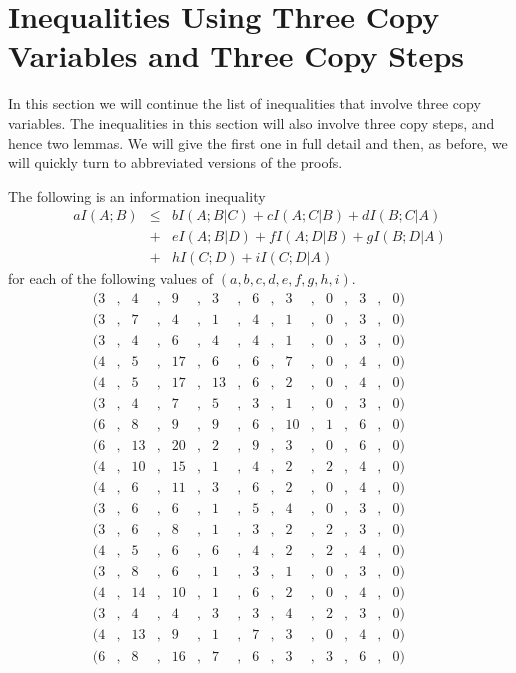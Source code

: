 \documentclass[10pt,journal]{IEEEtran}
\begin{document}

\section{Inequalities Using Three Copy Variables and Three Copy Steps}\label{ThreeCopiesB}

In this section we will continue the list of inequalities that involve three copy variables.
The inequalities in this section will also involve three copy steps, and hence two lemmas.
We will give the first one in full detail and then, as before, we will quickly turn to
abbreviated versions of the proofs.

\begin{theorem}
The following is an information inequality
\begin{eqnarray*}
aI(A;B) &\leq& bI(A;B|C) + cI(A;C|B) + dI(B;C|A) \\
      &+&  eI(A;B|D) + fI(A;D|B)+ gI(B;D|A)\\
      &+& hI(C;D) + iI(C;D|A)
\end{eqnarray*}
for each of the following values of $(a,b,c,d,e,f,g,h,i)$.
\begin{align}
&&(3&,&4&,&9&,&3&,&6&,&3&,&0&,&3&,&0)&&&& \label{ineq3.17}\\
&&(3&,&7&,&4&,&1&,&4&,&1&,&0&,&3&,&0)&&&& \label{ineq3.18}\\
&&(3&,&4&,&6&,&4&,&4&,&1&,&0&,&3&,&0)&&&& \label{ineq3.19}\\
&&(4&,&5&,&17&,&6&,&6&,&7&,&0&,&4&,&0)&&&& \label{ineq3.20}\\
&&(4&,&5&,&17&,&13&,&6&,&2&,&0&,&4&,&0)&&&& \label{ineq3.21}\\
&&(3&,&4&,&7&,&5&,&3&,&1&,&0&,&3&,&0)&&&& \label{ineq3.22}\\
&&(6&,&8&,&9&,&9&,&6&,&10&,&1&,&6&,&0)&&&& \label{ineq3.23}\\
&&(6&,&13&,&20&,&2&,&9&,&3&,&0&,&6&,&0)&&&& \label{ineq3.24}\\
&&(4&,&10&,&15&,&1&,&4&,&2&,&2&,&4&,&0)&&&& \label{ineq3.25}\\
&&(4&,&6&,&11&,&3&,&6&,&2&,&0&,&4&,&0)&&&& \label{ineq3.26}\\
&&(3&,&6&,&6&,&1&,&5&,&4&,&0&,&3&,&0)&&&& \label{ineq3.27}\\
&&(3&,&6&,&8&,&1&,&3&,&2&,&2&,&3&,&0)&&&& \label{ineq3.28}\\
&&(4&,&5&,&6&,&6&,&4&,&2&,&2&,&4&,&0)&&&& \label{ineq3.29}\\
&&(3&,&8&,&6&,&1&,&3&,&1&,&0&,&3&,&0)&&&& \label{ineq3.30}\\
&&(4&,&14&,&10&,&1&,&6&,&2&,&0&,&4&,&0)&&&& \label{ineq3.31}\\
&&(3&,&4&,&4&,&3&,&3&,&4&,&2&,&3&,&0)&&&& \label{ineq3.32}\\
&&(4&,&13&,&9&,&1&,&7&,&3&,&0&,&4&,&0)&&&& \label{ineq3.33}\\
&&(6&,&8&,&16&,&7&,&6&,&3&,&3&,&6&,&0)&&&& \label{ineq3.34}
\end{align}
\end{theorem}
\end{document}
